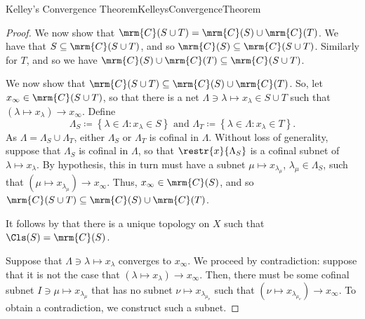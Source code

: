 \begin{thm}{Kelley's Convergence Theorem}{KelleysConvergenceTheorem}
\begin{proof}
We now show that $\mrm{C}(S\cup T)=\mrm{C}(S)\cup \mrm{C}(T)$.  We have that $S\subseteq \mrm{C}(S\cup T)$, and so $\mrm{C}(S)\subseteq \mrm{C}(S\cup T)$.  Similarly for $T$, and so we have $\mrm{C}(S)\cup \mrm{C}(T)\subseteq \mrm{C}(S\cup T)$.

We now show that $\mrm{C}(S\cup T)\subseteq \mrm{C}(S)\cup \mrm{C}(T)$.  So, let $x_\infty \in \mrm{C}(S\cup T)$, so that there is a net $\Lambda \ni \lambda \mapsto x_\lambda \in S\cup T$ such that $(\lambda \mapsto x_\lambda )\to x_\infty$.  Define
\begin{equation}
\Lambda _S\coloneqq \left\{ \lambda \in \Lambda :x_\lambda \in S\right\} \text{ and }\Lambda _T\coloneqq \left\{ \lambda \in \Lambda :x_\lambda \in T\right\} .
\end{equation}
As $\Lambda =\Lambda _S\cup \Lambda _T$, either $\Lambda _S$ or $\Lambda _T$ is cofinal in $\Lambda$.  Without loss of generality, suppose that $\Lambda _S$ is cofinal in $\Lambda$, so that $\restr{x}{\Lambda _S}$ is a cofinal subnet of $\lambda \mapsto x_\lambda$.  By hypothesis, this in turn must have a subnet $\mu \mapsto x_{\lambda _\mu}$, $\lambda _\mu \in \Lambda _S$, such that $(\mu \mapsto x_{\lambda _\mu})\to x_\infty$.  Thus, $x_\infty \in \mrm{C}(S)$, and so $\mrm{C}(S\cup T)\subseteq \mrm{C}(S)\cup \mrm{C}(T)$.

It follows by  that there is a unique topology on $X$ such that $\Cls (S)=\mrm{C}(S)$.

Suppose that $\Lambda \ni \lambda \mapsto x_\lambda$ converges to $x_\infty$.  We proceed by contradiction:  suppose that it is not the case that $(\lambda \mapsto x_\lambda )\to x_\infty$.  Then, there must be some cofinal subnet $I\ni \mu \mapsto x_{\lambda _\mu}$ that has no subnet $\nu \mapsto x_{\lambda _{\mu _\nu}}$ such that $(\nu \mapsto x_{\lambda _{\mu _\nu}})\to x_\infty$.  To obtain a contradiction, we construct such a subnet.


\end{proof}
\end{thm}
